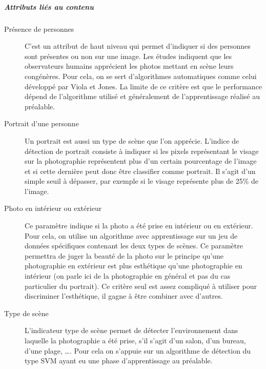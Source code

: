\documentclass[11pt, french,screen]{report-rd-info}
\begin{document}
\subparagraph{Attributs liés au contenu}
\begin{description}
\item[Présence de personnes]
C’est un attribut de haut niveau qui permet d’indiquer si des personnes sont présentes ou non sur une image. Les études indiquent que les observateurs humains apprécient les photos mettant en scène leurs congénères. Pour cela, on se sert d’algorithmes automatiques comme celui développé par Viola et Jones. La limite de ce critère est que le performance dépend de l’algorithme utilisé et généralement de l’apprentissage réalisé au préalable.
\item[Portrait d'une personne]
Un portrait est aussi un type de scène que l’on apprécie. L’indice de détection de portrait consiste à indiquer si les pixels représentant le visage sur la photographie représentent plus d’un certain pourcentage de l’image et si cette dernière peut donc être classifier comme portrait. Il s’agit d’un simple seuil à dépasser, par exemple si le visage représente plus de 25\% de l’image.
\item[Photo en intérieur ou extérieur]
Ce paramètre indique si la photo a été prise en intérieur ou en extérieur. Pour cela, on utilise un algorithme avec apprentissage sur un jeu de données spécifiques contenant les deux types de scènes. Ce paramètre permettra de juger la beauté de la photo sur le principe qu’une photographie en extérieur est plus esthétique qu’une photographie en intérieur (on parle ici de la photographie en général et pas du cas particulier du portrait). Ce critère seul est assez compliqué à utiliser pour discriminer l’esthétique, il gagne à être combiner avec d’autres.
\item[Type de scène]
L’indicateur type de scène permet de détecter l’environnement dans laquelle la photographie a été prise, s’il s’agit d’un salon, d’un bureau, d’une plage, \ldots. Pour cela on s’appuie sur un algorithme de détection du type SVM ayant eu une phase d’apprentissage au préalable.
\end{description}
\end{document}
